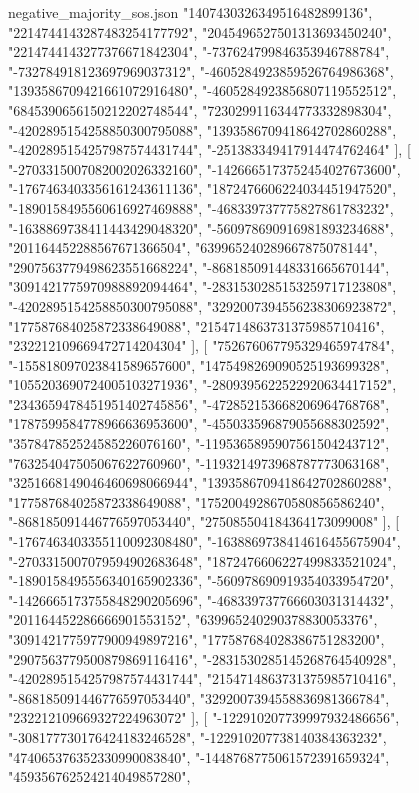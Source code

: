 \begin{filecontents*}[overwrite]{negative_majority_sos.json}
    "1407430326349516482899136",
    "2214744143287483254177792",
    "2045496527501313693450240",
    "2214744143277376671842304",
    "-737624799846353946788784",
    "-732784918123697969037312",
    "-4605284923859526764986368",
    "1393586709421661072916480",
    "-4605284923856807119552512",
    "6845390656150212202748544",
    "7230299116344773332898304",
    "-4202895154258850300795088",
    "1393586709418642702860288",
    "-4202895154257987574431744",
    "-251383349417914474762464"
   ],
   [
    "-2703315007082002026332160",
    "-1426665173752454027673600",
    "-1767463403356161243611136",
    "1872476606224034451947520",
    "-1890158495560616927469888",
    "-468339737775827861783232",
    "-1638869738411443429048320",
    "-560978690916981893234688",
    "201164452288567671366504",
    "639965240289667875078144",
    "2907563779498623551668224",
    "-868185091448331665670144",
    "3091421775970988892094464",
    "-2831530285153259717123808",
    "-4202895154258850300795088",
    "3292007394556238306923872",
    "177587684025872338649088",
    "2154714863731375985710416",
    "232212109669472714204304"
   ],
   [
    "752676067795329465974784",
    "-155818097023841589657600",
    "1475498269090525193699328",
    "1055203690724005103271936",
    "-2809395622522920634417152",
    "2343659478451951402745856",
    "-472852153668206964768768",
    "1787599584778966636953600",
    "-455033596879055688302592",
    "357847852524585226076160",
    "-1195365895907561504243712",
    "763254047505067622760960",
    "-1193214973968787773063168",
    "3251668149046460698066944",
    "1393586709418642702860288",
    "177587684025872338649088",
    "1752004928670580856586240",
    "-868185091446776597053440",
    "275085504184364173099008"
   ],
   [
    "-1767463403355110092308480",
    "-1638869738414616455675904",
    "-2703315007079594902683648",
    "1872476606227499833521024",
    "-1890158495556340165902336",
    "-560978690919354033954720",
    "-1426665173755848290205696",
    "-468339737766603031314432",
    "201164452286666901553152",
    "639965240290378830053376",
    "3091421775977900949897216",
    "177587684028386751283200",
    "2907563779500879869116416",
    "-2831530285145268764540928",
    "-4202895154257987574431744",
    "2154714863731375985710416",
    "-868185091446776597053440",
    "3292007394558836981366784",
    "232212109669327224963072"
   ],
   [
    "-122910207739997932486656",
    "-308177730176424183246528",
    "-122910207738140384363232",
    "474065376352330990083840",
    "-1448768775061572391659324",
    "459356762524214049857280",

\end{filecontents*}
